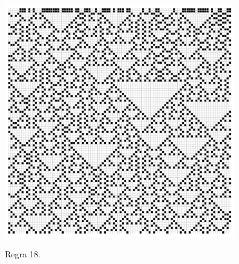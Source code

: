 \documentclass[a4paper, 11pt]{tufte-handout}
\begin{document}
\begin{marginfigure}
  \centering
  \includegraphics[width=0.75\textwidth]{tarefa-1/rule-18-0.png}
  \caption{Regra 18.}
  \label{fig:fig_rule18}
\end{marginfigure}
\end{document}
